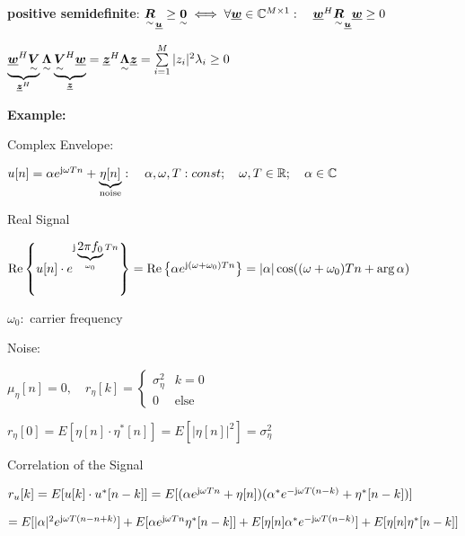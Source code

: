 \bigskip


\textbf{positive semidefinite}: $\underset{\sim}{\boldsymbol {R}}_{\underline{\boldsymbol {u}}}\geq \underset{\sim}{\boldsymbol {0}}\iff \forall \underline{\boldsymbol {w}} \in \mathbb{C}^{M\times 1}: \quad \underline{\boldsymbol {w}}^H\underset{\sim}{\boldsymbol {R}}_{\underline{\boldsymbol {u}}}\underline{\boldsymbol {w}}\geq 0$

\pfeil $\underbrace{\underline{\boldsymbol {w}}^H\underset{\sim}{\boldsymbol {V}}}_{\underline{\boldsymbol {z}}^H}\underset{\sim}{\boldsymbol {\Lambda}}\underbrace{\underset{\sim}{\boldsymbol {V}}^H\underline{\boldsymbol {w}}}_{\underline{\boldsymbol {z}}}=\underline{\boldsymbol {z}}^H\underset{\sim}{\boldsymbol {\Lambda}}\underline{\boldsymbol {z}}=
\sum\limits_{i=1}^M|z_i|^2\lambda_i\geq 0$\bigskip


\textbf{Example:}

Complex Envelope:

\quad$u[n]=\alpha e^{\mathrm{j} \omega T n} + \underbrace{\eta[n]}_{\textrm{noise}}: \quad \alpha,\omega,T: const;\quad \omega,T\in\mathbb{R}; \quad \alpha\in\mathbb{C}$

Real Signal

\quad $\operatorname{Re}\left\{u[n]\cdot e^{\mathrm{j} \underbrace{2 \pi f_0}_{\omega_0} T n}\right\}=\operatorname{Re}\left\{\alpha e^{\mathrm{j}(\omega+\omega_0)Tn}\right\}=|\alpha| \cos ((\omega+\omega_0)Tn + \arg \alpha)$

\with $\omega_0:$ 	carrier frequency

Noise:

\quad $\mu_\eta[n]=0, \quad r_\eta[k]=\left\lbrace \begin{matrix} \sigma_\eta^2 & k=0\\0&\textrm{else}\end{matrix} \right.$

\quad $r_\eta[0]=E[\eta[n]\cdot\eta^*[n]]=E[|\eta[n]|^2]=\sigma_\eta^2$

Correlation of the Signal

\quad $r_u[k]=E[u[k]\cdot u^*[n-k]]
=E[(\alpha e^{\mathrm{j} \omega T n} + \eta[n])(\alpha^* e^{-\mathrm{j} \omega T (n-k)} + \eta^*[n-k])]$

\quad $=E[|\alpha|^2 e^{\mathrm{j} \omega T (n-n+k)}]+E[\alpha e^{\mathrm{j} \omega T n}\eta^*[n-k]]+E[\eta[n]\alpha^* e^{-\mathrm{j} \omega T (n-k)}]+E[\eta[n]\eta^*[n-k]]$

